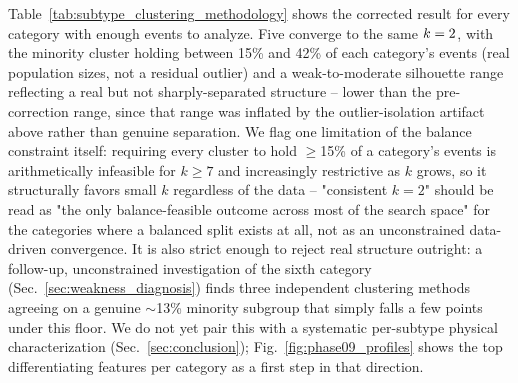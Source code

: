 Table~\ref{tab:subtype_clustering_methodology} shows the corrected result for every category with enough events to analyze. Five converge to the same $k=2$, with the minority cluster holding between 15\% and 42\% of each category's events (real population sizes, not a residual outlier) and a weak-to-moderate silhouette range reflecting a real but not sharply-separated structure -- lower than the pre-correction range, since that range was inflated by the outlier-isolation artifact above rather than genuine separation. %
We flag one limitation of the balance constraint itself: requiring every cluster to hold $\geq$15\% of a category's events is arithmetically infeasible for $k\geq7$ and increasingly restrictive as $k$ grows, so it structurally favors small $k$ regardless of the data -- "consistent $k=2$" should be read as "the only balance-feasible outcome across most of the search space" for the categories where a balanced split exists at all, not as an unconstrained data-driven convergence. It is also strict enough to reject real structure outright: a follow-up, unconstrained investigation of the sixth category (Sec.~\ref{sec:weakness_diagnosis}) finds three independent clustering methods agreeing on a genuine $\sim$13\% minority subgroup that simply falls a few points under this floor. %
We do not yet pair this with a systematic per-subtype physical characterization (Sec.~\ref{sec:conclusion}); Fig.~\ref{fig:phase09_profiles} shows the top differentiating features per category as a first step in that direction.

